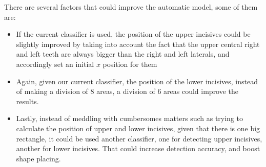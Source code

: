 There are several factors that could improve the automatic model, some of them
are:
\begin{itemize}
  \item If the current classifier is used, the position of the upper incisives
could be slightly improved by taking into account the fact that the upper
central right and left teeth are always bigger than the right and left laterals,
and accordingly set an initial $x$ position for them
  \item Again, given our current classifier, the position of the lower
incisives, instead of making a division of 8 areas, a division of 6 areas could
improve the results.
  \item Lastly, instead of meddling with cumbersomes matters such as trying to
calculate the position of upper and lower incisives, given that there is one big
rectangle, it could be used another classifier, one for detecting upper
incisives, another for lower incisives. That could increase detection accuracy,
and boost shape placing.
\end{itemize}

